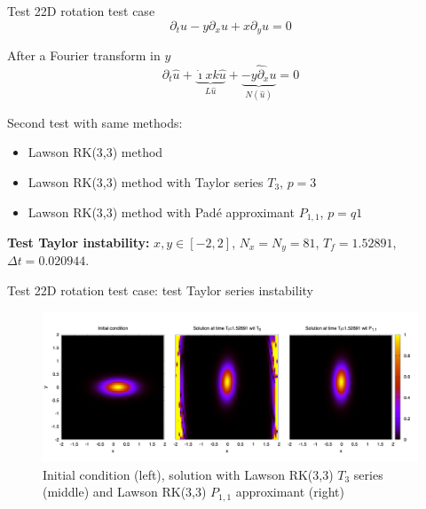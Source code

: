 \documentclass{beamer}
\newcommand{\mbold}[1]{{\textbf{\color{PLB}#1}}}
\newcommand{\I}{\dot{\imath}}
\begin{document}
\begin{frame}{Test 2}{2D rotation test case}
  $$\partial_t u - y\partial_x u + x\partial_y u = 0$$

  After a Fourier transform in $y$
  $$\partial_t \hat{u} + \underbrace{\I xk\hat{u}}_{L \hat{u}} + \underbrace{\widehat{-y\partial_x u}}_{N(\hat{u})} = 0$$

  Second test with same methods:
  \begin{itemize}
    \item Lawson RK(3,3) method
    \item Lawson RK(3,3) method with Taylor series $T_3$, $p=3$
    \item Lawson RK(3,3) method with Padé approximant $P_{1,1}$, $p=q1$
  \end{itemize}
  \mbold{Test Taylor instability:} $x,y\in[-2,2]$, $N_x=N_y=81$, $T_f=1.52891$, $\Delta t=0.020944$.
\end{frame}
\begin{frame}{Test 2}{2D rotation test case: test Taylor series instability}
  \begin{figure}
    \centering
    \includegraphics[width=\textwidth]{img/uf_t3p11}
    \caption{Initial condition (left), solution with Lawson RK(3,3) $T_3$ series (middle) and Lawson RK(3,3) $P_{1,1}$ approximant (right)}
  \end{figure}
\end{frame}

\end{document}
